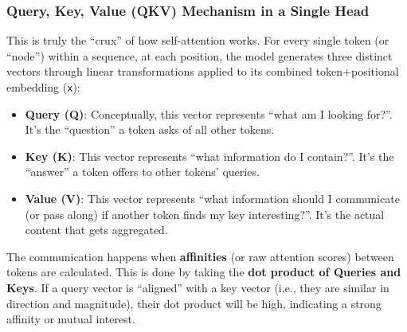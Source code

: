 \subsubsection{Query, Key, Value (QKV) Mechanism in a Single Head}

This is truly the ``crux'' of how self-attention works. For every single token (or ``node'') within a sequence, at each position, the model generates three distinct vectors through linear transformations applied to its combined token+positional embedding (\texttt{x}):
\begin{itemize}
    \item \textbf{Query (Q)}: Conceptually, this vector represents ``what am I looking for?''. It's the ``question'' a token asks of all other tokens.
    \item \textbf{Key (K)}: This vector represents ``what information do I contain?''. It's the ``answer'' a token offers to other tokens' queries.
    \item \textbf{Value (V)}: This vector represents ``what information should I communicate (or pass along) if another token finds my key interesting?''. It's the actual content that gets aggregated.
\end{itemize}

The communication happens when \textbf{affinities} (or raw attention scores) between tokens are calculated. This is done by taking the \textbf{dot product of Queries and Keys}. If a query vector is ``aligned'' with a key vector (i.e., they are similar in direction and magnitude), their dot product will be high, indicating a strong affinity or mutual interest.

